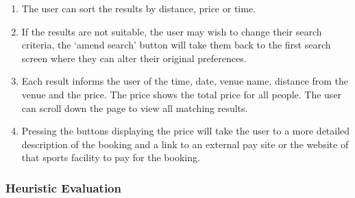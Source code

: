 \begin{enumerate}
	\item The user can sort the results by distance, price or time.
	\item If the results are not suitable, the user may wish to change their
		search criteria, the `amend search' button will take them back to the
		first search screen where they can alter their original preferences.
	\item Each result informs the user of the time, date, venue name, distance
		from the venue and the price. The price shows the total price for all
		people. The user can scroll down the page to view all matching results.
	\item Pressing the buttons displaying the price will take the user to a
		more detailed description of the booking and a link to an external pay
		site or the website of that sports facility to pay for the booking.
\end{enumerate}

\fullwidth%
\subsubsection{Heuristic Evaluation}

